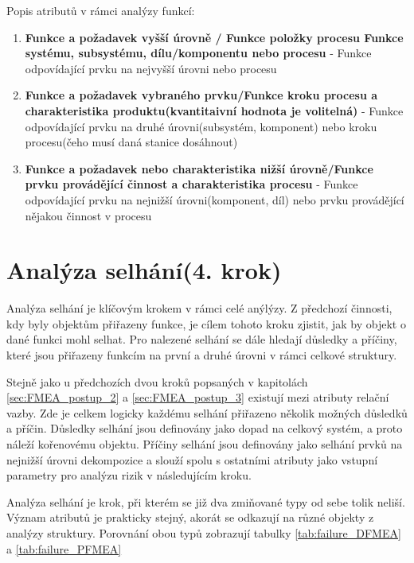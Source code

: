 Popis atributů v rámci analýzy funkcí:
\begin{enumerate}
	\item \textbf{Funkce a požadavek vyšší úrovně / Funkce položky procesu Funkce systému, subsystému, dílu/komponentu nebo procesu} - Funkce odpovídající prvku na nejvyšší úrovni nebo procesu 
	\item \textbf{Funkce a požadavek vybraného prvku/Funkce kroku procesu a charakteristika produktu(kvantitaivní hodnota je volitelná)} - Funkce odpovídající prvku na druhé úrovni(subsystém, komponent) nebo kroku procesu(čeho musí daná stanice dosáhnout)
	\item \textbf{Funkce a požadavek nebo charakteristika nižší úrovně/Funkce prvku provádějící činnost a charakteristika procesu} - Funkce odpovídající prvku na nejnižší úrovni(komponent, díl) nebo prvku provádějící nějakou činnost v procesu
\end{enumerate}



\section{Analýza selhání(4. krok)}
Analýza selhání je klíčovým krokem v rámci celé anýlýzy. Z předchozí činnosti, kdy byly objektům přiřazeny funkce, je cílem tohoto kroku zjistit, jak by objekt o dané funkci mohl selhat. Pro nalezené selhání se dále hledají důsledky a příčiny, které jsou přiřazeny funkcím na první a druhé úrovni v rámci celkové struktury. 

Stejně jako u předchozích dvou kroků popsaných v kapitolách \ref{sec:FMEA_postup_2} a \ref{sec:FMEA_postup_3} existují mezi atributy relační vazby. Zde je celkem logicky každému selhání přiřazeno několik možných důsledků a příčin. Důsledky selhání jsou definovány jako dopad na celkový systém, a proto náleží kořenovému objektu. Příčiny selhání jsou definovány jako selhání prvků na nejnižší úrovni dekompozice a slouží spolu s ostatními atributy jako vstupní parametry pro analýzu rizik v následujícím kroku.

Analýza selhání je krok, při kterém se již dva zmiňované typy od sebe tolik neliší. Význam atributů je prakticky stejný, akorát se odkazují na různé objekty z analýzy struktury. Porovnání obou typů zobrazují tabulky \ref{tab:failure_DFMEA} a \ref{tab:failure_PFMEA}


